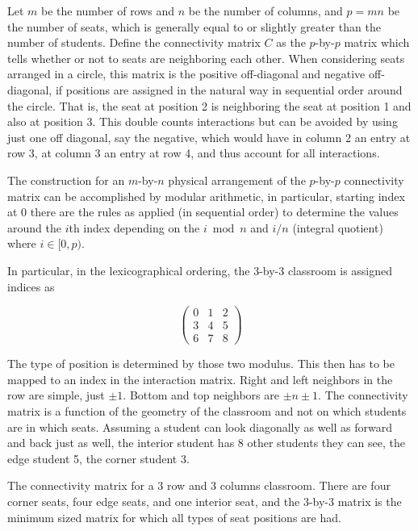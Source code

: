 \documentclass{article}
\begin{document}
Let $m$ be the number of rows and $n$ be the number of columns, and $p = mn$ be the number of seats, which is generally equal to or slightly greater than the number of students. Define the connectivity matrix $C$ as the $p$-by-$p$ matrix which tells whether or not to seats are neighboring each other. When considering seats arranged in a circle, this matrix is the positive off-diagonal and negative off-diagonal, if positions are assigned in the natural way in sequential order around the circle. That is, the seat at position 2 is neighboring the seat at position 1 and also at position 3. This double counts interactions but can be avoided by using just one off diagonal, say the negative, which would have in column 2 an entry at row 3, at column 3 an entry at row 4, and thus account for all interactions.

The construction for an $m$-by-$n$ physical arrangement of the $p$-by-$p$ connectivity matrix can be accomplished by modular arithmetic, in particular, starting index at $0$ there are the rules as applied (in sequential order) to determine the values around the $i$th index depending on the $i \bmod n$ and $i/n$ (integral quotient) where $i \in [0, p)$.

In particular, in the lexicographical ordering, the 3-by-3 classroom is assigned indices as

$$\begin{pmatrix} 
0 & 1 & 2 \\ 
3 & 4 & 5 \\ 
6 & 7 & 8 
\end{pmatrix}$$

The type of position is determined by those two modulus. This then has to be mapped to an index in the interaction matrix. Right and left neighbors in the row are simple, just $\pm 1$. Bottom and top neighbors are $\pm n \pm 1$.
The connectivity matrix is a function of the geometry of the classroom and not on which students are in which seats. Assuming a student can look diagonally as well as forward and back just as well, the interior student has 8 other students they can see, the edge student 5, the corner student 3.


\begin{table}[!h]
    \caption{The connectivity matrix for a 3 row and 3 columns classroom. There are four corner seats, four edge seats, and one interior seat, and the 3-by-3 matrix is the minimum sized matrix for which all types of seat positions are had.}
\centering

\end{table}
\end{document}
